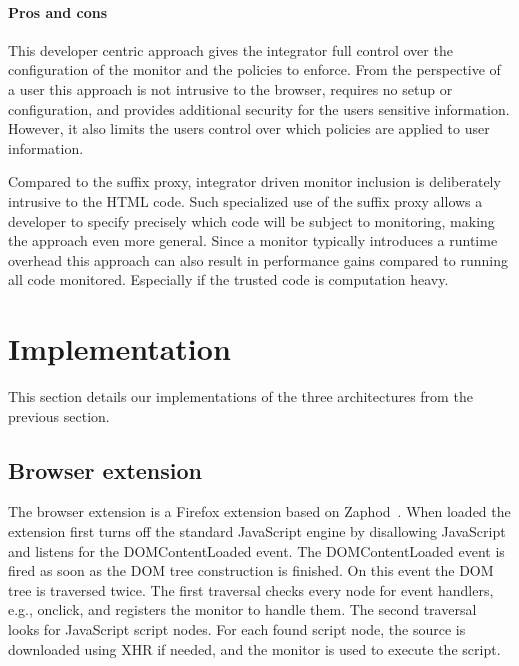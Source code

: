 \documentclass{llncs}
\newcommand{\todo}[1]{\colorbox{red}{\textcolor{white}{\sffamily\bfseries\scriptsize TODO}} \textcolor{red}{#1} \textcolor{red}{$\blacktriangleleft$}}
\begin{document}
\paragraph{Pros and cons}

This developer centric approach gives the integrator full control over the 
configuration of the monitor and the policies to enforce. From the perspective of a user this 
approach is not intrusive to the browser, requires no setup or configuration, 
and provides additional security for the users sensitive information. However, 
it also limits the users control over which policies are applied to user information. 

Compared to the suffix proxy, integrator driven monitor 
inclusion is deliberately intrusive to the HTML code. Such specialized use of the suffix 
proxy allows a developer to specify precisely which code will be subject to 
monitoring, making the approach even more general. 
Since a monitor typically introduces a runtime overhead this approach can also 
result in performance gains compared to running all code monitored. Especially 
if the trusted code is computation heavy.



\section{Implementation}
\label{sec:impl}

This section details our implementations of the three architectures
from the previous section. 


\subsection{Browser extension}

The browser extension is a Firefox extension based on Zaphod~\cite{Zaphod}.
When loaded the extension first turns off the standard JavaScript engine by
disallowing JavaScript and listens for the DOMContentLoaded event.  The
DOMContentLoaded event is fired as soon as the DOM tree construction is
finished.  On this event the DOM tree is traversed twice. The first traversal
checks every node for event handlers, e.g., onclick, and registers the monitor
to handle them. The second traversal looks for JavaScript script nodes.  For
each found script node, the source is downloaded using XHR if needed, and the
monitor is used to execute the script.
\end{document}
